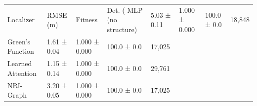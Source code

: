 \begin{tabular}{lllll}
\toprule
Localizer & RMSE (m) & Fitness & Det. (%
\midrule
MLP (no structure) & 5.03 ± 0.11 & 1.000 ± 0.000 & 100.0 ± 0.0 & 18,848 \\
Green's Function & 1.61 ± 0.04 & 1.000 ± 0.000 & 100.0 ± 0.0 & 17,025 \\
Learned Attention & 1.15 ± 0.14 & 1.000 ± 0.000 & 100.0 ± 0.0 & 29,761 \\
NRI-Graph & 3.20 ± 0.05 & 1.000 ± 0.000 & 100.0 ± 0.0 & 17,025 \\
\bottomrule
\end{tabular}

